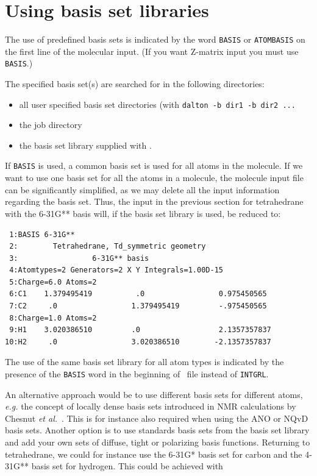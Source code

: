 \section{Using basis set libraries}\label{sec:molbasis}

The use of predefined basis sets is indicated
by the word {\tt BASIS} or {\tt ATOMBASIS} on the first line of the
molecular input.
(If you want Z-matrix input you must use {\tt BASIS}.)

The specified basis set(s) are searched for in the following directories:
\begin{itemize}
\item all user specified basis set directories (with {\tt dalton -b dir1 -b dir2 ...}
\item the job directory
\item the basis set library supplied with \dalton.
\end{itemize}

If {\tt BASIS} is used, a common basis set is used for all atoms in
the molecule.
If we want to use one basis set for all the
atoms in a molecule, the molecule input file can be significantly
simplified, as we may delete all the input information regarding the
basis set. Thus, the input in the previous section for tetrahedrane
with the 6-31G** basis will, if the basis set library is used,  be reduced
to:

\begin{verbatim}
 1:BASIS 6-31G**
 2:        Tetrahedrane, Td_symmetric geometry
 3:                 6-31G** basis
 4:Atomtypes=2 Generators=2 X Y Integrals=1.00D-15
 5:Charge=6.0 Atoms=2
 6:C1    1.379495419          .0                 0.975450565
 7:C2     .0                 1.379495419         -.975450565
 8:Charge=1.0 Atoms=2
 9:H1    3.020386510         .0                  2.1357357837
10:H2     .0                 3.020386510        -2.1357357837
\end{verbatim}

The use of the same basis set library for all atom types is indicated by the presence of the
\verb|BASIS| word in the beginning of \molinp\ file instead of
\verb|INTGRL|.

An alternative approach would be to use different basis sets for
different atoms, {\it e.g.\/} the concept of locally
dense basis sets
introduced in NMR calculations by Chesnut {\it et
al.\/}~\cite{dbcberkdmdaejcc14}. This is for instance also required
when using the ANO or
NQvD
basis sets. Another option is to use
standards basis sets from the basis set 
library and add your own sets
of diffuse, tight or polarizing basis
functions. Returning to
tetrahedrane, we could for instance use the 6-31G* basis set for
carbon and the 4-31G** basis set for hydrogen. This could be achieved
with

